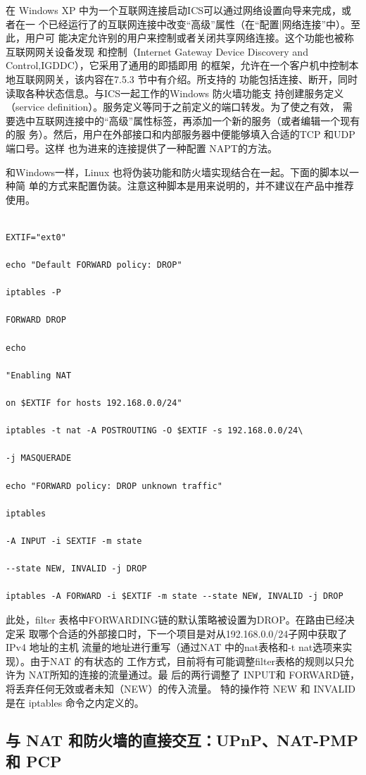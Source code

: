 在 Windows XP 中为一个互联网连接启动ICS可以通过网络设置向导来完成，或者在一
个已经运行了的互联网连接中改变“高级”属性（在“配置|网络连接”中）。至此，用户可
能决定允许别的用户来控制或者关闭共享网络连接。这个功能也被称互联网网关设备发现
和控制（Internet Gateway Device Discovery and Control,IGDDC），它采用了通用的即插即用
的框架，允许在一个客户机中控制本地互联网网关，该内容在7.5.3 节中有介绍。所支持的
功能包括连接、断开，同时读取各种状态信息。与ICS一起工作的Windows 防火墙功能支
持创建服务定义（service definition）。服务定义等同于之前定义的端口转发。为了使之有效，
需要选中互联网连接中的“高级”属性标签，再添加一个新的服务（或者编辑一个现有的服
务）。然后，用户在外部接口和内部服务器中便能够填入合适的TCP 和UDP端口号。这样
也为进来的连接提供了一种配置 NAPT的方法。

和Windows一样，Linux 也将伪装功能和防火墙实现结合在一起。下面的脚本以一种简
单的方式来配置伪装。注意这种脚本是用来说明的，并不建议在产品中推荐使用。

\begin{verbatim}
    
EXTIF="ext0"

echo "Default FORWARD policy: DROP"

iptables -P

FORWARD DROP

echo

"Enabling NAT

on $EXTIF for hosts 192.168.0.0/24"

iptables -t nat -A POSTROUTING -O $EXTIF -s 192.168.0.0/24\

-j MASQUERADE

echo "FORWARD policy: DROP unknown traffic"

iptables

-A INPUT -i SEXTIF -m state

--state NEW, INVALID -j DROP

iptables -A FORWARD -i $EXTIF -m state --state NEW, INVALID -j DROP
\end{verbatim}

此处，filter 表格中FORWARDING链的默认策略被设置为DROP。在路由已经决定采
取哪个合适的外部接口时，下一个项目是对从192.168.0.0/24子网中获取了IPv4 地址的主机
流量的地址进行重写（通过NAT 中的nat表格和-t nat选项来实现）。由于NAT 的有状态的
工作方式，目前将有可能调整filter表格的规则以只允许为 NAT所知的连接的流量通过。最
后的两行调整了 INPUT和 FORWARD链，将丢弃任何无效或者未知（NEW）的传入流量。
特的操作符 NEW 和 INVALID 是在 iptables 命令之内定义的。

\subsection{与 NAT 和防火墙的直接交互：UPnP、NAT-PMP 和 PCP}

